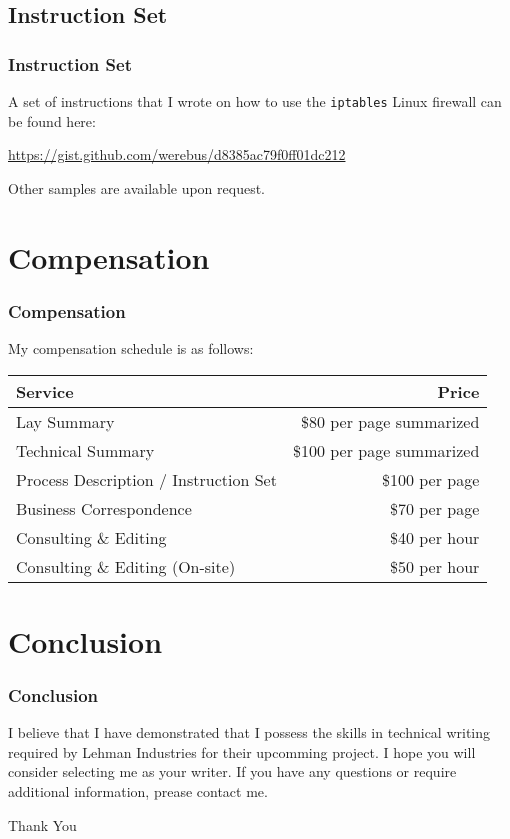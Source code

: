 \documentclass{beamer}
\begin{document}
\subsection{Instruction Set}
\begin{frame}
  \frametitle{Instruction Set}
  A set of instructions that I wrote on how to use the \texttt{iptables} Linux
  firewall can be found here:

  \href{https://gist.github.com/werebus/d8385ac79f0ff01dc212}%
       {https://gist.github.com/werebus/d8385ac79f0ff01dc212}
\end{frame}

\begin{frame}
  Other samples are available upon request.
\end{frame}

\section{Compensation}
\begin{frame}
  \frametitle{Compensation}
  My compensation schedule is as follows:
  \begin{center}
    \begin{tabular}[c]{|l|r|}
      \hline
      \textbf{Service} & \textbf{Price} \\ \hline
      Lay Summary & \$80 per page summarized \\
      Technical Summary & \$100 per page summarized \\
      Process Description / Instruction Set & \$100 per page  \\
      Business Correspondence & \$70 per page\\
      Consulting \& Editing & \$40 per hour \\
      Consulting \& Editing (On-site) & \$50 per hour \\
      \hline
    \end{tabular}
  \end{center}
\end{frame}
    
\section{Conclusion}
\begin{frame}
  \frametitle{Conclusion}
  I believe that I have demonstrated that I possess the skills in technical
  writing required by Lehman Industries for their upcomming project.  I hope
  you will consider selecting me as your writer.  If you have any questions or
  require additional information, prease contact me.

  \begin{center}
    {\Large Thank You}
  \end{center}
\end{frame}
\end{document}
